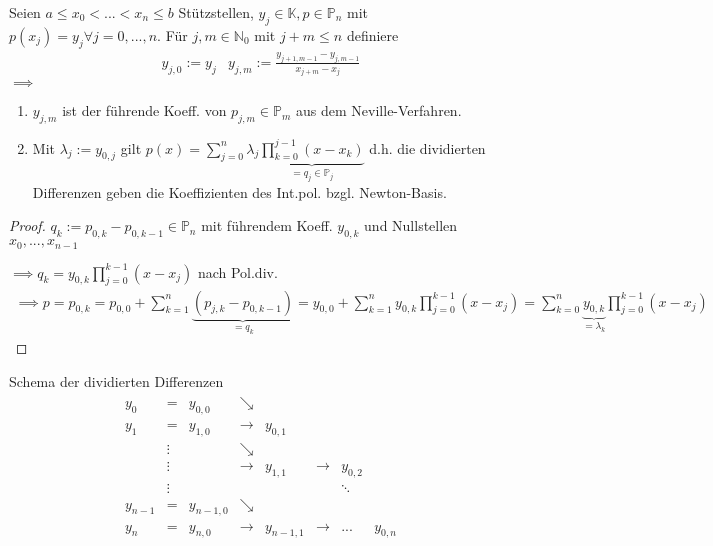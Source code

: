 \begin{theorem}
	Seien $a \leq x_0 < ... < x_n \leq b$ Stützstellen, $y_j \in \mathbb{K}, p \in \mathbb{P}_n$ mit $p(x_j) = y_j \forall j=0, ..., n$. Für $j, m \in \mathbb{N}_0$ mit $j+m \leq n$ definiere
	\begin{align*}
		y_{j,0} := y_j & y_{j,m} := \frac{y_{j+1,m-1}-y_{j,m-1}}{x_{j+m}-x_j}
	\end{align*}
	$\implies$
	\begin{enumerate}
		\item $y_{j,m}$ ist der führende Koeff. von $p_{j,m} \in \mathbb{P}_m$ aus dem Neville-Verfahren.
		\item Mit $\lambda_j := y_{0,j}$ gilt $p(x) = \sum_{j=0}^{n} \lambda_j \underbrace{\prod_{k=0}^{j-1}(x-x_k)}_{=q_j \in \mathbb{P}_j}$ d.h. die dividierten Differenzen geben die Koeffizienten des Int.pol. bzgl. Newton-Basis.
	\end{enumerate}	
\end{theorem}

\begin{proof}
	$q_k := p_{0,k} - p_{0,k-1} \in \mathbb{P}_n$ mit führendem Koeff. $y_{0,k}$ und Nullstellen $x_0, ..., x_{n-1}$
	
	$\implies q_k = y_{0,k} \prod_{j=0}^{k-1}(x-x_j)$ nach Pol.div.
	\begin{align*}
		\implies p = p_{0,k} = p_{0,0} + \sum_{k=1}^{n} \underbrace{(p_{j,k} - p_{0,k-1})}_{=q_k} = y_{0,0} + \sum_{k=1}^{n} y_{0,k} \prod_{j=0}^{k-1} (x-x_j) = \sum_{k=0}^{n} \underbrace{y_{0,k}}_{=\lambda_k} \prod_{j=0}^{k-1} (x-x_j)
	\end{align*}
\end{proof}

Schema der dividierten Differenzen
\begin{align*}
	\begin{matrix}
		y_0 &=      & y_{0,0} & \searrow & & & \\
		y_1 &=      & y_{1,0} & \rightarrow & y_{0,1} & & \\
		    &\vdots &         & \searrow & & & \\
		    &\vdots &         & \rightarrow & y_{1,1} & \rightarrow & y_{0,2} \\
		    &\vdots &         &            & &  &\ddots\\
		y_{n-1} &=  & y_{n-1,0} & \searrow & & & \\
		y_n &=      & y_{n,0} & \rightarrow & y_{n-1,1} & \rightarrow & ... & y_{0,n}\\
	\end{matrix}
\end{align*}


